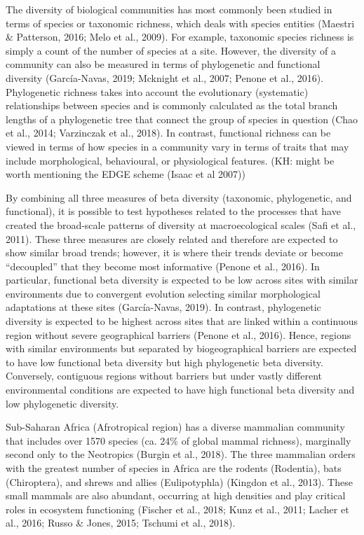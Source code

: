 \documentclass{article}
\begin{document}
\vspace{5mm}

The diversity of biological communities has most commonly been studied in terms of species or taxonomic richness, which deals with species entities (Maestri \& Patterson, 2016; Melo et al., 2009). For example, taxonomic species richness is simply a count of the number of species at a site. However, the diversity of a community can also be measured in terms of phylogenetic and functional diversity (García-Navas, 2019; Mcknight et al., 2007; Penone et al., 2016). Phylogenetic richness takes into account the evolutionary (systematic) relationships between species and is commonly calculated as the total branch lengths of a phylogenetic tree that connect the group of species in question (Chao et al., 2014; Varzinczak et al., 2018). In contrast, functional richness can be viewed in terms of how species in a community vary in terms of traits that may include morphological, behavioural, or physiological features. (KH: might be worth mentioning the EDGE scheme (Isaac et al 2007))

\vspace{5mm}

By combining all three measures of beta diversity (taxonomic, phylogenetic, and functional), it is possible to test hypotheses related to the processes that have created the broad-scale patterns of diversity at macroecological scales (Safi et al., 2011). These three measures are closely related and therefore are expected to show similar broad trends; however, it is where their trends deviate or become “decoupled” that they become most informative (Penone et al., 2016). In particular, functional beta diversity is expected to be low across sites with similar environments due to convergent evolution selecting similar morphological adaptations at these sites (García-Navas, 2019). In contrast, phylogenetic diversity is expected to be highest across sites that are linked within a continuous region without severe geographical barriers (Penone et al., 2016). Hence, regions with similar environments but separated by biogeographical barriers are expected to have low functional beta diversity but high phylogenetic beta diversity. Conversely, contiguous regions without barriers but under vastly different environmental conditions are expected to have high functional beta diversity and low phylogenetic diversity. 

\vspace{5mm}

Sub-Saharan Africa (Afrotropical region) has a diverse mammalian community that includes over 1570 species (ca. 24\% of global mammal richness), marginally second only to the Neotropics (Burgin et al., 2018). The three mammalian orders with the greatest number of species in Africa are the rodents (Rodentia), bats (Chiroptera), and shrews and allies (Eulipotyphla) (Kingdon et al., 2013). These small mammals are also abundant, occurring at high densities and play critical roles in ecosystem functioning (Fischer et al., 2018; Kunz et al., 2011; Lacher et al., 2016; Russo \& Jones, 2015; Tschumi et al., 2018). 
\end{document}
